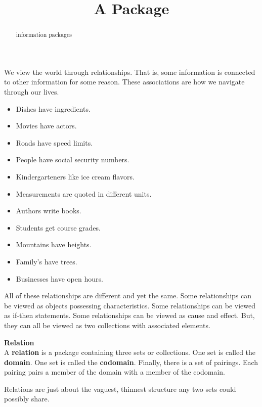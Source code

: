 \documentclass{ximera}
\title{A Package}
\begin{document}
\begin{abstract}
information packages
\end{abstract}
\maketitle


We view the world through relationships. That is, some information is connected to other information for some reason. These associations are how we navigate through our lives.

\begin{itemize}
\item Dishes have ingredients.
\item Movies have actors.
\item Roads have speed limits.
\item People have social security numbers.
\item Kindergarteners like ice cream flavors.
\item Measurements are quoted in different units.
\item Authors write books.
\item Students get course grades.
\item Mountains have heights.
\item Family's have trees.
\item Businesses have open hours.
\end{itemize}


All of these relationships are different and yet the same.  Some relationships can be viewed as objects possessing characteristics. Some relationships can be viewed as if-then statements.  Some relationships can be viewed as cause and effect. But, they can all be viewed as two collections with associated elements.







\begin{definition} \textbf{\textcolor{green!50!black}{Relation}} \\
A \textbf{relation} is a package containing three sets or collections. One set is called the \textbf{domain}. One set is called the \textbf{codomain}.  Finally, there is a set of pairings.  Each pairing pairs a member of the domain with a member of the codomain.
\end{definition}


Relations are just about the vaguest, thinnest structure any two sets could possibly share. \\
\end{document}
